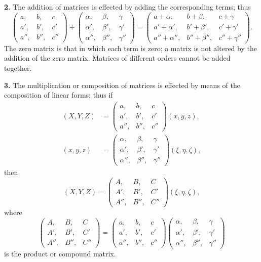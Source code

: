 \documentclass[11pt,a4paper]{book}
\begin{document}
\begin{center}
\medskip
\noindent\textbf{2.} The addition of matrices is effected by adding the corresponding terms; thus
\[
\begin{pmatrix} a, & b, & c \\ a', & b', & c' \\ a'', & b'', & c'' \end{pmatrix}
+
\begin{pmatrix} \alpha, & \beta, & \gamma \\ \alpha', & \beta', & \gamma' \\ \alpha'', & \beta'', & \gamma'' \end{pmatrix}
=
\begin{pmatrix} a+\alpha, & b+\beta, & c+\gamma \\ a'+\alpha', & b'+\beta', & c'+\gamma' \\ a''+\alpha'', & b''+\beta'', & c''+\gamma'' \end{pmatrix}.
\]
The zero matrix is that in which each term is zero; a matrix is not altered by the addition of the zero matrix. Matrices of different orders cannot be added together.

\medskip
\noindent\textbf{3.} The multiplication or composition of matrices is effected by means of the composition of linear forms; thus if
\begin{align*}
(X,Y,Z) &= \begin{pmatrix} a, & b, & c \\ a', & b', & c' \\ a'', & b'', & c'' \end{pmatrix}(x,y,z), \\
(x,y,z) &= \begin{pmatrix} \alpha, & \beta, & \gamma \\ \alpha', & \beta', & \gamma' \\ \alpha'', & \beta'', & \gamma'' \end{pmatrix}(\xi,\eta,\zeta),
\end{align*}
then
\[
(X,Y,Z) = \begin{pmatrix} A, & B, & C \\ A', & B', & C' \\ A'', & B'', & C'' \end{pmatrix}(\xi,\eta,\zeta),
\]
where
\[
\begin{pmatrix} A, & B, & C \\ A', & B', & C' \\ A'', & B'', & C'' \end{pmatrix}
=
\begin{pmatrix} a, & b, & c \\ a', & b', & c' \\ a'', & b'', & c'' \end{pmatrix}
\begin{pmatrix} \alpha, & \beta, & \gamma \\ \alpha', & \beta', & \gamma' \\ \alpha'', & \beta'', & \gamma'' \end{pmatrix}
\]
is the product or compound matrix.


\end{center}
\end{document}
